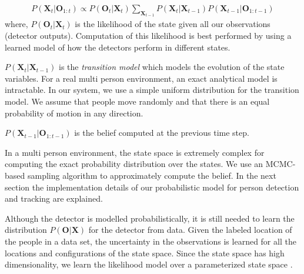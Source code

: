 
\begin{align}
P(\textbf{X}_{t} | \textbf{O}_{1:t}) \propto   P(\textbf{O}_{t} | \textbf{X}_{t}) \sum\limits_{\textbf{X}_{t-1}} P(\textbf{X}_{t}|\textbf{X}_{t-1}) P(\textbf{X}_{t-1}|\textbf{O}_{1:t-1}) \end{align} 
where, $P(\textbf{O}_{t} | \textbf{X}_{t})$ is the likelihood of the state given all our observations (detector outputs). Computation of this likelihood is best performed by using a learned model of how the detectors perform in different states.





$P(\textbf{X}_{t}|\textbf{X}_{t-1})$ is the \textit{transition model} which models the evolution of the state variables. For a real multi person environment, an exact analytical model is intractable. In our system, we use a simple uniform distribution for the transition model. We assume that people move randomly and that there is an equal probability of motion in any direction. 

$P(\textbf{X}_{t-1}|\textbf{O}_{1:t-1})$ is the belief computed at the previous time step.

In a multi person environment, the state space is extremely complex for computing the exact probability 
distribution over the states. We use an MCMC-based sampling algorithm to approximately compute the belief. In the next section the implementation details of our probabilistic model for person detection and tracking are explained.


Although the detector is modelled probabilistically, it is still needed to learn the distribution $P(\textbf{O}|\textbf{X})$ for the detector from data. Given the labeled location of the people in a data set, the uncertainty in the observations is learned for all the locations and configurations of the state space. Since the state space has high dimensionality, we learn the likelihood model over a parameterized state space \cite{berclaz-fleuret-fua-2008}.



